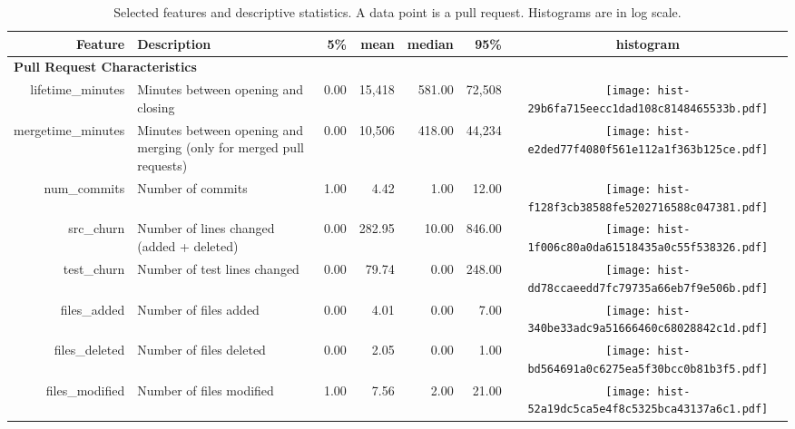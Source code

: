 \begin{table*}[t]
\centering
\caption{Selected features and descriptive statistics. A data point is a pull request. Histograms are in log scale.} 

\begin{smaller}
\begin{tabular}{rp{29em}rrrrc}
  \hline
  \bfseries{Feature} & \bfseries{Description} & \bfseries{5\%} & \bfseries{mean} & \bfseries{median} & \bfseries{95\%} & \bfseries{histogram} \\ 
  \hline
   \multicolumn{2}{l}{\bf{Pull Request Characteristics}}\\
lifetime\_minutes & Minutes between opening and closing & 0.00 & 15,418 & 581.00 & 72,508 & \texttt{[image: hist-29b6fa715eecc1dad108c8148465533b.pdf]} \\ 
  mergetime\_minutes & Minutes between opening and merging (only for merged pull
    requests) & 0.00 & 10,506 & 418.00 & 44,234 & \texttt{[image: hist-e2ded77f4080f561e112a1f363b125ce.pdf]} \\ 
  num\_commits & Number of commits & 1.00 & 4.42 & 1.00 & 12.00 & \texttt{[image: hist-f128f3cb38588fe5202716588c047381.pdf]} \\ 
  src\_churn & Number of lines changed (added + deleted) & 0.00 & 282.95 & 10.00 & 846.00 & \texttt{[image: hist-1f006c80a0da61518435a0c55f538326.pdf]} \\ 
  test\_churn & Number of test lines changed & 0.00 & 79.74 & 0.00 & 248.00 & \texttt{[image: hist-dd78ccaeedd7fc79735a66eb7f9e506b.pdf]} \\ 
  files\_added & Number of files added  & 0.00 & 4.01 & 0.00 & 7.00 & \texttt{[image: hist-340be33adc9a51666460c68028842c1d.pdf]} \\ 
  files\_deleted & Number of files deleted  & 0.00 & 2.05 & 0.00 & 1.00 & \texttt{[image: hist-bd564691a0c6275ea5f30bcc0b81b3f5.pdf]} \\ 
  files\_modified & Number of files modified  & 1.00 & 7.56 & 2.00 & 21.00 & \texttt{[image: hist-52a19dc5ca5e4f8c5325bca43137a6c1.pdf]} \\ 

\end{tabular}
\end{smaller}
\end{table*}
